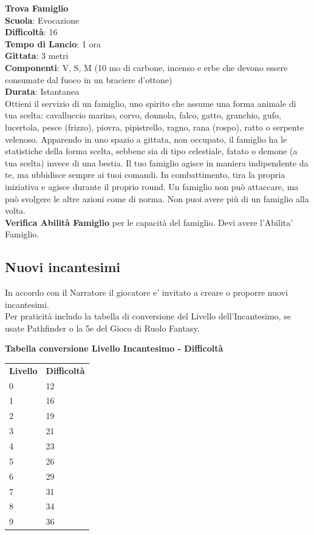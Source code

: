 \begin{multicols}{2}
\medskip\textbf{Trova Famiglio}\\
\textbf{Scuola}: Evocazione\\
\textbf{Difficoltà}: 16\\
\textbf{Tempo di Lancio}: 1 ora\\
\textbf{Gittata}: 3 metri\\
\textbf{Componenti}: V, S, M (10 mo di carbone, incenso e erbe che devono essere consumate dal fuoco in un braciere d'ottone)\\
\textbf{Durata}: Istantanea\\
Ottieni il servizio di un famiglio, uno spirito che assume una forma animale di tua scelta: cavalluccio marino, corvo, donnola, falco, gatto, granchio, gufo, lucertola, pesce (frizzo), piovra, pipistrello, ragno, rana (rospo), ratto o serpente velenoso. Apparendo in uno spazio a gittata, non occupato, il famiglio ha le statistiche della forma scelta, sebbene sia di tipo celestiale, fatato o demone (a tua scelta) invece di una bestia. Il tuo famiglio agisce in maniera indipendente da te, ma ubbidisce sempre ai tuoi comandi. In combattimento, tira la propria iniziativa e agisce durante il proprio round. Un famiglio non può attaccare, ma può svolgere le altre azioni come di norma. 
Non puoi avere più di un famiglio alla volta. \\
\textbf{Verifica Abilità Famiglio} per le capacità del famiglio. Devi avere l'Abilita' Famiglio.

\subsection{Nuovi incantesimi}

In accordo con il Narratore il giocatore e' invitato a creare o proporre nuovi incantesimi.\\
Per praticità includo la tabella di conversione del Livello dell'Incantesimo, se usate Pathfinder o la 5e del Gioco di Ruolo Fantasy.\\

\medskip

\textbf{Tabella conversione Livello Incantesimo - Difficoltà}

\medskip

\begin{tabular}{ll}
\textbf{Livello} & \textbf{Difficoltà}\\
0	& 12\\
1	& 16\\
2	& 19\\
3	& 21\\
4	& 23\\
5	& 26\\
6	& 29\\
7	& 31\\
8	& 34\\
9	& 36\\
\end{tabular}
\end{multicols}
